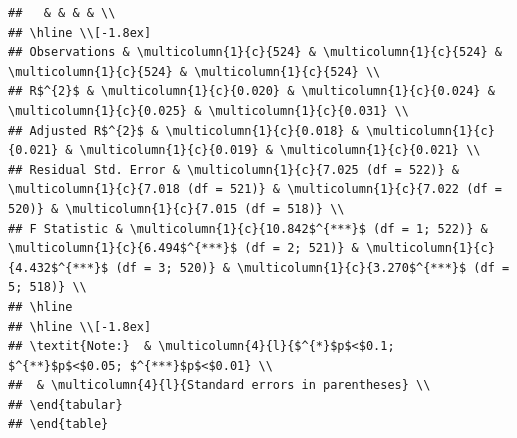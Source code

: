 \documentclass[
  12pt,
  landscape]{article}
\begin{document}
\begin{verbatim}
##   & & & & \\ 
## \hline \\[-1.8ex] 
## Observations & \multicolumn{1}{c}{524} & \multicolumn{1}{c}{524} & \multicolumn{1}{c}{524} & \multicolumn{1}{c}{524} \\ 
## R$^{2}$ & \multicolumn{1}{c}{0.020} & \multicolumn{1}{c}{0.024} & \multicolumn{1}{c}{0.025} & \multicolumn{1}{c}{0.031} \\ 
## Adjusted R$^{2}$ & \multicolumn{1}{c}{0.018} & \multicolumn{1}{c}{0.021} & \multicolumn{1}{c}{0.019} & \multicolumn{1}{c}{0.021} \\ 
## Residual Std. Error & \multicolumn{1}{c}{7.025 (df = 522)} & \multicolumn{1}{c}{7.018 (df = 521)} & \multicolumn{1}{c}{7.022 (df = 520)} & \multicolumn{1}{c}{7.015 (df = 518)} \\ 
## F Statistic & \multicolumn{1}{c}{10.842$^{***}$ (df = 1; 522)} & \multicolumn{1}{c}{6.494$^{***}$ (df = 2; 521)} & \multicolumn{1}{c}{4.432$^{***}$ (df = 3; 520)} & \multicolumn{1}{c}{3.270$^{***}$ (df = 5; 518)} \\ 
## \hline 
## \hline \\[-1.8ex] 
## \textit{Note:}  & \multicolumn{4}{l}{$^{*}$p$<$0.1; $^{**}$p$<$0.05; $^{***}$p$<$0.01} \\ 
##  & \multicolumn{4}{l}{Standard errors in parentheses} \\ 
## \end{tabular} 
## \end{table}
\end{verbatim}
\end{document}

